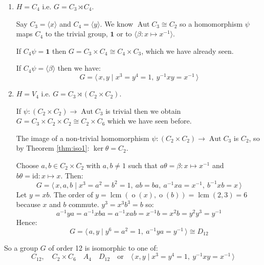 \documentclass[a4paper, oneside, 12pt, final]{article}
\theoremstyle{definition}
\DeclareMathOperator{\Aut}{Aut}
\DeclareMathOperator{\order}{o}
\DeclareMathOperator{\lcm}{lcm}
\begin{document}
\begin{enumerate}
    \item \(H = C_4\) i.e. \(G = C_3 \rtimes C_4\).

        Say \(C_3 = \langle x \rangle\) and \(C_4 = \langle y \rangle\).
        We know \(\Aut{C_3} \cong C_2\) so a homomorphism \(\psi\) maps \(C_4\)
        to the trivial group, \(\bm{1}\) or to \(\langle \beta:x \mapsto x^{-1}
        \rangle\).

        If \(C_4\psi = \bm{1}\) then \(G = C_3 \times C_4 \cong C_4 \times
        C_3\), which we have already seen.

        If \(C_4\psi = \langle \beta \rangle\) then we have:
        \[G = \langle\, x, y \mid x^3 = y^4 = 1,\ y^{-1}xy = x^{-1}\,\rangle\]

    \item \(H = V_4\) i.e. \(G = C_3 \rtimes (C_2 \times C_2)\).

        If \(\psi:(C_2 \times C_2) \to \Aut{C_3}\) is trivial then we obtain
        \(G = C_3 \times C_2 \times C_2 \cong C_2 \times C_6\) which we have
        seen before.

        The image of a non-trivial homomorphism \(\psi:(C_2 \times C_2) \to
        \Aut{C_3}\) is \(C_2\), so by Theorem \ref{thm:iso1}: \(\ker{\theta} =
        C_2\).

        Choose \(a, b \in C_2 \times C_2\) with \(a, b \neq 1\) such that
        \(a\theta = \beta:x \mapsto x^{-1}\) and \(b\theta = \text{id}:x
        \mapsto x\).
        Then:
        \[G = \langle\, x, a, b \mid x^3 = a^2 = b^2 = 1,\ ab = ba,\ a^{-1}xa =
        x^{-1},\ b^{-1}xb = x\,\rangle\]
        Let \(y = xb\).
        The order of \(y = \lcm{(\order{(x)}, \order{(b)})} = \lcm{(2, 3)} =
        6\) because \(x\) and \(b\) commute.
        \(y^3 = x^3b^3 = b\) so:
        \[ a^{-1}ya = a^{-1}xba = a^{-1}xab = x^{-1}b = x^2b = y^2y^3 = y^{-1}\]
        Hence:
        \[G = \langle\, a, y \mid y^6 = a^2 = 1,\ a^{-1}ya = y^{-1}\,\rangle
        \cong D_{12}\]
\end{enumerate}

So a group \(G\) of order 12 is isomorphic to one of:
\[
    C_{12}, \quad%
    C_2 \times C_6 \quad%
    A_4 \quad%
    D_{12} \quad \text{or} \quad%
    \langle\, x, y \mid x^3 = y^4 = 1,\ y^{-1}xy = x^{-1}\,\rangle
\]
\end{document}
